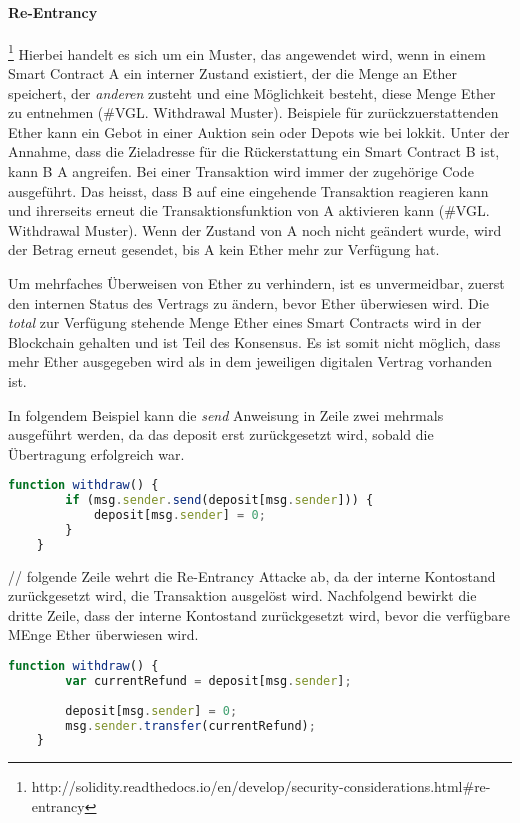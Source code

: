 \paragraph{Re-Entrancy}\footnote{http://solidity.readthedocs.io/en/develop/security-considerations.html\#re-entrancy}
Hierbei handelt es sich um ein Muster, das angewendet wird, wenn in einem Smart Contract A ein interner Zustand existiert, der die Menge an Ether speichert, der \emph{anderen} zusteht und eine Möglichkeit besteht, diese Menge Ether zu entnehmen (\#VGL. Withdrawal Muster). Beispiele für zurückzuerstattenden Ether kann ein Gebot in einer Auktion sein oder Depots wie bei lokkit.
Unter der Annahme, dass die Zieladresse für die Rückerstattung ein Smart Contract B ist, kann B A angreifen. Bei einer Transaktion wird immer der zugehörige Code ausgeführt. Das heisst, dass B auf eine eingehende Transaktion reagieren kann und ihrerseits erneut die Transaktionsfunktion von A aktivieren kann (\#VGL. Withdrawal Muster). Wenn der Zustand von A noch nicht geändert wurde, wird der Betrag erneut gesendet, bis A kein Ether mehr zur Verfügung hat.

Um mehrfaches Überweisen von Ether zu verhindern, ist es unvermeidbar, zuerst den internen Status des Vertrags zu ändern, bevor Ether überwiesen wird. Die \emph{total} zur Verfügung stehende Menge Ether eines Smart Contracts wird in der Blockchain gehalten und ist Teil des Konsensus. Es ist somit nicht möglich, dass mehr Ether ausgegeben wird als in dem jeweiligen digitalen Vertrag vorhanden ist. 

In folgendem Beispiel kann die \emph{send} Anweisung in Zeile zwei mehrmals ausgeführt werden, da das deposit erst zurückgesetzt wird, sobald die Übertragung erfolgreich war.
\begin{lstlisting}[language=javascript,caption=fehlerhaftes Code Snippet]
    function withdraw() {
        if (msg.sender.send(deposit[msg.sender])) {
            deposit[msg.sender] = 0;
        }
    }
\end{lstlisting}

// folgende Zeile wehrt die Re-Entrancy Attacke ab, da der interne Kontostand zurückgesetzt wird, die Transaktion ausgelöst wird.
Nachfolgend bewirkt die dritte Zeile, dass der interne Kontostand zurückgesetzt wird, bevor die verfügbare MEnge Ether überwiesen wird.
\begin{lstlisting}[language=javascript,caption=empfohlenes Code Snippet]
    function withdraw() {
        var currentRefund = deposit[msg.sender];
        
        deposit[msg.sender] = 0;
        msg.sender.transfer(currentRefund);
    }
\end{lstlisting}

